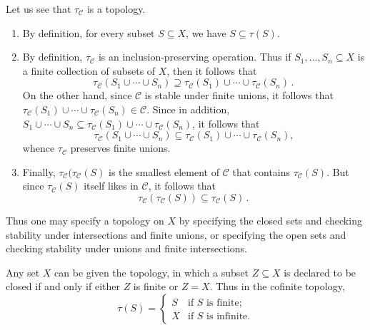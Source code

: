 \begin{nul}
	Let us see that $\tau_{\mathscr{C}}$ is a topology.
	\begin{enumerate}
		\item By definition, for every subset $S \subseteq X$, we have $S \subseteq \tau(S)$.
		\item By definition, $\tau_{\mathscr{C}}$ is an inclusion-preserving operation.
			Thus if $S_1, \dots, S_n \subseteq X$ is a finite collection of subsets of $X$, then it follows that 
			\[
				\tau_{\mathscr{C}}(S_1 \cup \cdots \cup S_n) \supseteq \tau_{\mathscr{C}}(S_1) \cup \cdots \cup \tau_{\mathscr{C}}(S_n) \period
			\]
			On the other hand, since $\mathscr{C}$ is stable under finite unions, it follows that $\tau_{\mathscr{C}}(S_1) \cup \cdots \cup \tau_{\mathscr{C}}(S_n) \in \mathscr{C}$.
			Since in addition, $S_1 \cup \cdots \cup S_n \subseteq \tau_{\mathscr{C}}(S_1) \cup \cdots \cup \tau_{\mathscr{C}}(S_n)$, it follows%
			that 
			\[
				\tau_{\mathscr{C}}(S_1 \cup \cdots \cup S_n) \subseteq \tau_{\mathscr{C}}(S_1) \cup \cdots \cup \tau_{\mathscr{C}}(S_n) \comma
			\]
			whence $\tau_{\mathscr{C}}$ preserves finite unions.
		\item Finally, $\tau_{\mathscr{C}}(\tau_{\mathscr{C}}(S)$ is the smallest element of $\mathscr{C}$ that contains $\tau_{\mathscr{C}}(S)$.
			But since $\tau_{\mathscr{C}}(S)$ itself likes in $\mathscr{C}$, it follows that
			\[
				\tau_{\mathscr{C}}(\tau_{\mathscr{C}}(S)) \subseteq \tau_{\mathscr{C}}(S) \period
			\]
	\end{enumerate}

	Thus one may specify a topology on $X$ by specifying the closed sets and checking stability under intersections and finite unions, or specifying the open sets and checking stability under unions and finite intersections.
\end{nul}

\begin{exm} Any set $X$ can be given the  topology, in which a subset $Z\subseteq X$ is declared to be closed if and only if either $Z$ is finite or $Z=X$.
	Thus in the cofinite topology,
	\[
		\tau(S) = \begin{cases}
			S & \text{if } S \text{ is finite;} \\
			X & \text{if } S \text{ is infinite.}
		\end{cases}
	\]
\end{exm}

